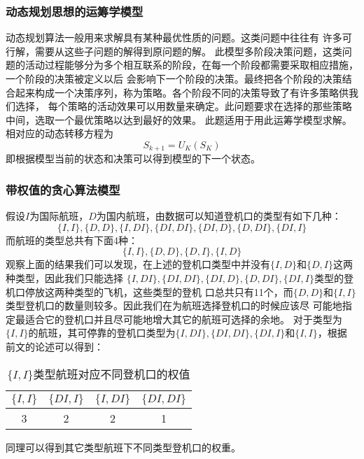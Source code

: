 \documentclass[bwprint]{gmcmthesis}
\begin{document}
\subsubsection{动态规划思想的运筹学模型}
动态规划算法一般用来求解具有某种最优性质的问题。这类问题中往往有
许多可行解，需要从这些子问题的解得到原问题的解。
此模型多阶段决策问题，这类问题的活动过程能够分为多个相互联系的阶段，在每一个阶段都需要采取相应措施，一个阶段的决策被定义以后
会影响下一个阶段的决策。最终把各个阶段的决策结合起来构成一个决策序列，称为策略。各个阶段不同的决策导致了有许多策略供我们选择，
每个策略的活动效果可以用数量来确定。此问题要求在选择的那些策略中间，选取一个最优策略以达到最好的效果。 此题适用于用此运筹学模型求解。
相对应的动态转移方程为
\begin{equation}
S_{k+1}=U_{K}\left ( S_{K} \right )
\end{equation}
即根据模型当前的状态和决策可以得到模型的下一个状态。
\subsubsection{带权值的贪心算法模型}
假设$I$为国际航班，$D$为国内航班，由数据可以知道登机口的类型有如下几种：
\begin{equation}
    \{I,I\},\{D,D\},\{I,DI\},\{DI,DI\},\{DI,D\},\{D,DI\},\{DI,I\}
\end{equation}
而航班的类型总共有下面4种：
\begin{equation}
    \{I,I\},\{D,D\},\{D,I\},\{I,D\}
\end{equation}
观察上面的结果我们可以发现，在上述的登机口类型中并没有$\{I,D\}$和$\{D,I\}$这两种类型，因此我们只能选择
$\{I,DI\},\{DI,DI\},\{DI,D\},\{D,DI\},\{DI,I\}$类型的登机口停放这两种类型的飞机，这些类型的登机
口总共只有11个，而$\{D,D\}$和$\{I,I\}$类型登机口的数量则较多。因此我们在为航班选择登机口的时候应该尽
可能地指定最适合它的登机口并且尽可能地增大其它的航班可选择的余地。
对于类型为$\{I,I\}$的航班，其可停靠的登机口类型为$\{I,DI\},\{DI,DI\},\{DI,I\}$和$\{I,I\}$，根据
前文的论述可以得到：

\begin{table*}[!h]
\centering
\caption{$\{I, I\}$类型航班对应不同登机口的权值}
\begin{tabular}{|c|c|c|c|}
    \hline
    $\{I, I\}$ & $\{DI, I\}$ & $\{I, DI\}$ & $\{DI, DI\}$\\
    \hline
    3&2&2&1\\
    \hline
\end{tabular}
\end{table*}

同理可以得到其它类型航班下不同类型登机口的权重。
\end{document}
